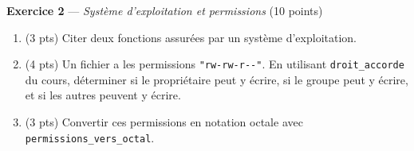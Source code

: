 \bigskip

\textbf{Exercice 2} --- \textit{Système d'exploitation et permissions} \hfill (10 points)

\begin{enumerate}
  \item (3 pts) Citer deux fonctions assurées par un système d'exploitation.
  \item (4 pts) Un fichier a les permissions \lstinline{"rw-rw-r--"}. En utilisant \lstinline{droit_accorde} du cours, déterminer si le propriétaire peut y écrire, si le groupe peut y écrire, et si les autres peuvent y écrire.
  \item (3 pts) Convertir ces permissions en notation octale avec \lstinline{permissions_vers_octal}.
\end{enumerate}

